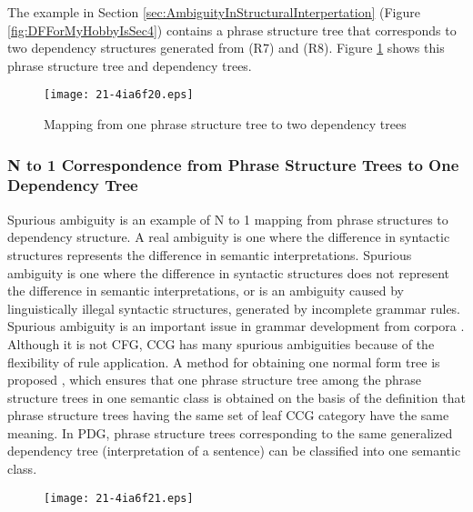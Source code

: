 \documentclass[english]{jnlp_1.4_rep}
\theoremstyle{break}
\theoremstyle{plain}
\theoremstyle{plain}
\begin{document}
The example in Section \ref{sec:AmbiguityInStructuralInterpertation}
(Figure \ref{fig:DFForMyHobbyIsSec4}) contains a phrase structure tree
that corresponds to two dependency structures generated from (R7) and
(R8). Figure \ref{fig:MapFromOnePTToTwoDTs} shows this phrase structure
tree and dependency trees.

\begin{figure}[b]
\begin{center}
\texttt{[image: 21-4ia6f20.eps]}
\end{center}
\caption{Mapping from one phrase structure tree to two dependency trees}
\label{fig:MapFromOnePTToTwoDTs}
\end{figure}


\subsubsection{N to 1 Correspondence from Phrase Structure Trees to One Dependency Tree}

Spurious ambiguity \cite{Noro02_e} is an example of N to 1 mapping
from phrase structures to dependency structure. A real ambiguity is
one where the difference in syntactic structures represents the
difference in semantic interpretations. Spurious ambiguity is one
where the difference in syntactic structures does not represent the
difference in semantic interpretations, or is an ambiguity caused by
linguistically illegal syntactic structures, generated by incomplete
grammar rules. Spurious ambiguity is an important issue in grammar
development from corpora \cite{Noro05_e}. Although it is not CFG, CCG
has many spurious ambiguities because of the flexibility of rule
application. A method for obtaining one normal form tree is proposed
\cite{Eisner96b}, which ensures that one phrase structure tree
among the phrase structure trees in one semantic class is obtained
on the basis of the definition that phrase structure trees having the
same set of leaf CCG category have the same meaning. In PDG, phrase
structure trees corresponding to the same generalized dependency tree
(interpretation of a sentence) can be classified into one semantic
class.

\begin{figure}[b]
\begin{center}
\texttt{[image: 21-4ia6f21.eps]}
\end{center}
\label{fig:DFContainingNtoOneMapping}
\end{figure}
\end{document}
